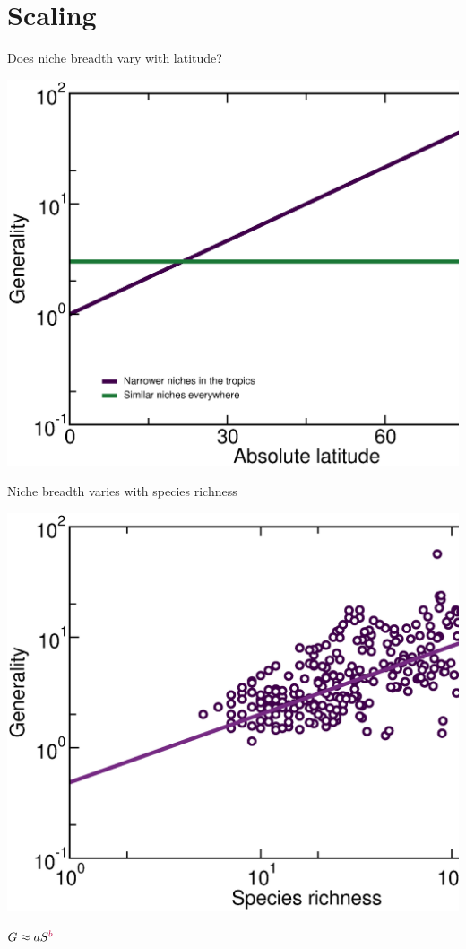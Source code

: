 \documentclass{beamer}
\begin{document}
\section*{Scaling}
  \begin{frame}{Does niche breadth vary with latitude?}

    \begin{center}
      \includegraphics*[width=.8\textwidth]{Figures/results/Gen_vs_lat_simulated.eps}
    \end{center}

  \end{frame}


  \begin{frame}{Niche breadth varies with species richness}

    \begin{center}
      \includegraphics*[width=.654\textwidth]{Figures/results/Gen_dots_vs_S_fitline_observed.eps}

    \vspace{.3cm}
    \end{center}
      \hspace{.74cm}
      {\Large      
      $G \approx aS^{\color{purple}b}$}
  \end{frame}
\end{document}
